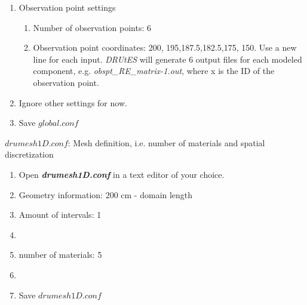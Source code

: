 \begin{enumerate}
\begin{enumerate}
\end{enumerate}
\item Observation point settings \begin{enumerate}
\item Number of observation points: 6 
\item Observation point coordinates: 200, 195,187.5,182.5,175, 150. Use a new line for each input. \textit{DRUtES} will generate 6 output files for each modeled component, e.g. \textit{obspt\_RE\_matrix-1.out}, where x is the ID of the observation point. 
\end{enumerate}
\item Ignore other settings for now. 
\item Save $global.conf$
\end{enumerate}


$drumesh1D.conf$: Mesh definition, i.e. number of materials and spatial discretization
\begin{enumerate}
\item Open \textbf{\emph{drumesh1D.conf}} in a text editor of your choice. 
\item Geometry information: 200 cm - domain length
\item Amount of intervals: 1
\item
{}
\item number of materials: 5
\item {}
\item Save $drumesh1D.conf$
\end{enumerate}


